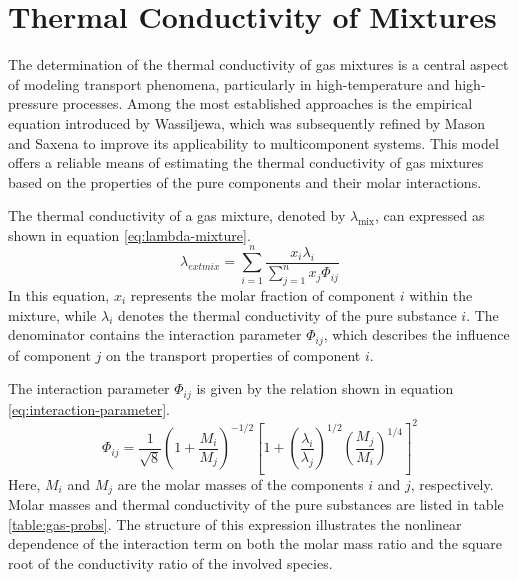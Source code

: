 \section{Thermal Conductivity of Mixtures}
The determination of the thermal conductivity of gas mixtures is a central aspect of modeling
transport phenomena, particularly in high-temperature and high-pressure processes. Among the
most established approaches is the empirical equation introduced by Wassiljewa, which was
subsequently refined by Mason and Saxena to improve its applicability to multicomponent systems.
This model offers a reliable means of estimating the thermal conductivity of gas mixtures based
on the properties of the pure components and their molar interactions.

The thermal conductivity of a gas mixture, denoted by \(\lambda_{\text{mix}}\), can expressed as
shown in equation \ref{eq:lambda-mixture}.\begin{equation}\label{eq:lambda-mixture}\lambda_{  ext{mix}} = \sum_{i=1}^{n} \frac{x_i \lambda_i}{\sum_{j=1}^{n} x_j \Phi_{ij}}\end{equation}In this equation, \(x_i\) represents the molar fraction of component \(i\) within the mixture,
while \(\lambda_i\) denotes the thermal conductivity of the pure substance \(i\). The denominator
contains the interaction parameter \(\Phi_{ij}\), which describes the influence of component
\(j\) on the transport properties of component \(i\).

The interaction parameter \(\Phi_{ij}\) is given by the relation shown in equation \ref{eq:interaction-parameter}.\begin{equation}\label{eq:interaction-parameter}\Phi_{ij} = \frac{1}{\sqrt{8}} \left(1 + \frac{M_i}{M_j} \right)^{-1/2} \left[ 1 + \left( \frac{\lambda_i}{\lambda_j} \right)^{1/2} \left( \frac{M_j}{M_i} \right)^{1/4} \right]^2\end{equation}Here, \(M_i\) and \(M_j\) are the molar masses of the components \(i\) and \(j\), respectively.
Molar masses and thermal conductivity of the pure substances are listed in table \ref{table:gas-probs}.
The structure of this expression illustrates the nonlinear dependence of the interaction term on
both the molar mass ratio and the square root of the conductivity ratio of the involved species.


